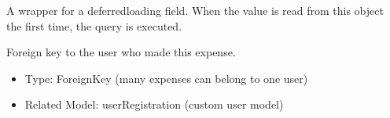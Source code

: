 \documentclass[letterpaper,10pt,english]{sphinxmanual}
\begin{document}
\begin{fulllineitems}

\begin{fulllineitems}
\label{\detokenize{expensesApp:expensesApp.models.Expense.id}}
\pysigstartsignatures
\pysigline
{}
\pysigstopsignatures
\sphinxAtStartPar
A wrapper for a deferred\sphinxhyphen{}loading field. When the value is read from this
object the first time, the query is executed.

\end{fulllineitems}


\begin{fulllineitems}
\label{\detokenize{expensesApp:expensesApp.models.Expense.objects}}
\pysigstartsignatures
\pysigline
{}
\pysigstopsignatures
\end{fulllineitems}


\begin{fulllineitems}
\label{\detokenize{expensesApp:expensesApp.models.Expense.user_id}}
\pysigstartsignatures
\pysigline
{}
\pysigstopsignatures
\end{fulllineitems}


\begin{fulllineitems}
\label{\detokenize{expensesApp:id13}}
\pysigstartsignatures
\pysigline
{}
\pysigstopsignatures
\sphinxAtStartPar
Foreign key to the user who made this expense.
\begin{description}
\begin{itemize}
\item {} 
\sphinxAtStartPar
Type: ForeignKey (many expenses can belong to one user)

\item {} 
\sphinxAtStartPar
Related Model: userRegistration (custom user model)


\end{itemize}
\end{description}
\end{fulllineitems}
\end{fulllineitems}
\end{document}
